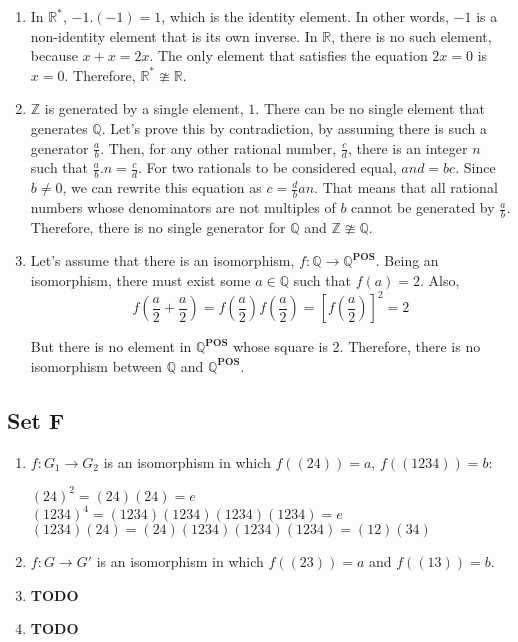\begin{enumerate}
    \item In $ \mathbb{R^*} $, $ -1.(-1) = 1 $, which is the identity element. In other words, $ -1 $ is a non-identity element that is its own inverse. In $ \mathbb{R} $, there is no such element, because $ x + x = 2x $. The only element that satisfies the equation $ 2x = 0 $ is $  x = 0 $. Therefore, $ \mathbb{R^*} \ncong \mathbb{R} $.

    \item $ \mathbb{Z} $ is generated by a single element, $ 1 $. There can be no single element that generates $ \mathbb{Q} $. Let's prove this by contradiction, by assuming there is such a generator $ \frac{a}{b} $. Then, for any other rational number, $ \frac{c}{d} $, there is an integer $ n $ such that $ \frac{a}{b}.n = \frac{c}{d} $. For two rationals to be considered equal, $ and = bc $. Since $ b \ne 0 $, we can rewrite this equation as $ c = \frac{d}{b}an $. That means that all rational numbers whose denominators are not multiples of $ b $ cannot be generated by $ \frac{a}{b} $. Therefore, there is no single generator for $ \mathbb{Q} $ and $ \mathbb{Z} \ncong \mathbb{Q} $. 

    \item Let's assume that there is an isomorphism, $ f: \mathbb{Q} \to \mathbb{Q}^{\mathbf{POS}} $. Being an isomorphism, there must exist some $ a \in \mathbb{Q} $ such that $ f(a) = 2 $. Also,
    $$
        f\left(\frac{a}{2} + \frac{a}{2}\right) = f\left(\frac{a}{2}\right)f\left(\frac{a}{2}\right) = \left[f\left(\frac{a}{2}\right)\right]^2 = 2
    $$

    But there is no element in $ \mathbb{Q}^{\mathbf{POS}} $ whose square is 2. Therefore, there is no isomorphism between $ \mathbb{Q}$ and $\mathbb{Q}^{\mathbf{POS}}$.
\end{enumerate}

\subsection{Set F}
\begin{enumerate}
    \item $ f: G_1 \to G_2 $ is an isomorphism in which $ f((24)) = a $, $ f((1234)) = b $:

    $ (24)^2 = (24)(24) = e $\\
    $ (1234)^4 = (1234)(1234)(1234)(1234) = e $\\
    $ (1234)(24) = (24)(1234)(1234)(1234) = (12)(34) $

    \item  $ f: G \to G' $ is an isomorphism in which $ f((23)) = a $ and $ f((13)) = b $.

    \item \textbf{TODO}

    \item \textbf{TODO}
\end{enumerate}

